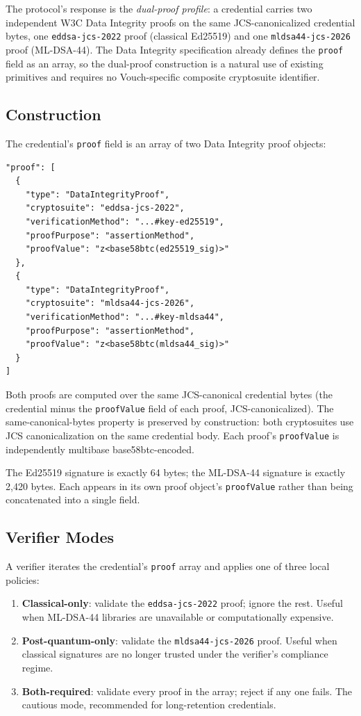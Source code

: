 \documentclass[11pt,a4paper,twocolumn]{article}
\begin{document}
The protocol's response is the \emph{dual-proof profile}: a credential carries two independent W3C Data Integrity proofs on the same JCS-canonicalized credential bytes, one \texttt{eddsa-jcs-2022} proof (classical Ed25519) and one \texttt{mldsa44-jcs-2026} proof (ML-DSA-44). The Data Integrity specification already defines the \verb|proof| field as an array, so the dual-proof construction is a natural use of existing primitives and requires no Vouch-specific composite cryptosuite identifier.

\subsection{Construction}

The credential's \verb|proof| field is an array of two Data Integrity proof objects:

\begin{verbatim}
"proof": [
  {
    "type": "DataIntegrityProof",
    "cryptosuite": "eddsa-jcs-2022",
    "verificationMethod": "...#key-ed25519",
    "proofPurpose": "assertionMethod",
    "proofValue": "z<base58btc(ed25519_sig)>"
  },
  {
    "type": "DataIntegrityProof",
    "cryptosuite": "mldsa44-jcs-2026",
    "verificationMethod": "...#key-mldsa44",
    "proofPurpose": "assertionMethod",
    "proofValue": "z<base58btc(mldsa44_sig)>"
  }
]
\end{verbatim}

Both proofs are computed over the same JCS-canonical credential bytes (the credential minus the \verb|proofValue| field of each proof, JCS-canonicalized). The same-canonical-bytes property is preserved by construction: both cryptosuites use JCS canonicalization on the same credential body. Each proof's \verb|proofValue| is independently multibase base58btc-encoded.

The Ed25519 signature is exactly 64 bytes; the ML-DSA-44 signature is exactly 2,420 bytes. Each appears in its own proof object's \verb|proofValue| rather than being concatenated into a single field.

\subsection{Verifier Modes}

A verifier iterates the credential's \verb|proof| array and applies one of three local policies:

\begin{enumerate}[label=\arabic*.,leftmargin=*]
\item \textbf{Classical-only}: validate the \texttt{eddsa-jcs-2022} proof; ignore the rest. Useful when ML-DSA-44 libraries are unavailable or computationally expensive.
\item \textbf{Post-quantum-only}: validate the \texttt{mldsa44-jcs-2026} proof. Useful when classical signatures are no longer trusted under the verifier's compliance regime.
\item \textbf{Both-required}: validate every proof in the array; reject if any one fails. The cautious mode, recommended for long-retention credentials.
\end{enumerate}
\end{document}
